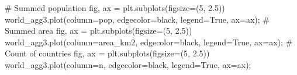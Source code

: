 \documentclass[
  letterpaper,
]{krantz}
\newenvironment{Shaded}{\begin{snugshade}}{\end{snugshade}}
\newcommand{\CommentTok}[1]{\textcolor[rgb]{0.37,0.37,0.37}{#1}}
\newcommand{\DecValTok}[1]{\textcolor[rgb]{0.68,0.00,0.00}{#1}}
\newcommand{\FloatTok}[1]{\textcolor[rgb]{0.68,0.00,0.00}{#1}}
\newcommand{\NormalTok}[1]{\textcolor[rgb]{0.00,0.23,0.31}{#1}}
\newcommand{\OperatorTok}[1]{\textcolor[rgb]{0.37,0.37,0.37}{#1}}
\newcommand{\StringTok}[1]{\textcolor[rgb]{0.13,0.47,0.30}{#1}}
\newcommand{\VariableTok}[1]{\textcolor[rgb]{0.07,0.07,0.07}{#1}}
\begin{document}
\begin{Shaded}
\begin{Highlighting}[]
\CommentTok{\# Summed population}
\NormalTok{fig, ax }\OperatorTok{=}\NormalTok{ plt.subplots(figsize}\OperatorTok{=}\NormalTok{(}\DecValTok{5}\NormalTok{, }\FloatTok{2.5}\NormalTok{))}
\NormalTok{world\_agg3.plot(column}\OperatorTok{=}\StringTok{\textquotesingle{}pop\textquotesingle{}}\NormalTok{, edgecolor}\OperatorTok{=}\StringTok{\textquotesingle{}black\textquotesingle{}}\NormalTok{, legend}\OperatorTok{=}\VariableTok{True}\NormalTok{, ax}\OperatorTok{=}\NormalTok{ax)}\OperatorTok{;}
\CommentTok{\# Summed area}
\NormalTok{fig, ax }\OperatorTok{=}\NormalTok{ plt.subplots(figsize}\OperatorTok{=}\NormalTok{(}\DecValTok{5}\NormalTok{, }\FloatTok{2.5}\NormalTok{))}
\NormalTok{world\_agg3.plot(column}\OperatorTok{=}\StringTok{\textquotesingle{}area\_km2\textquotesingle{}}\NormalTok{, edgecolor}\OperatorTok{=}\StringTok{\textquotesingle{}black\textquotesingle{}}\NormalTok{, legend}\OperatorTok{=}\VariableTok{True}\NormalTok{, ax}\OperatorTok{=}\NormalTok{ax)}\OperatorTok{;}
\CommentTok{\# Count of countries}
\NormalTok{fig, ax }\OperatorTok{=}\NormalTok{ plt.subplots(figsize}\OperatorTok{=}\NormalTok{(}\DecValTok{5}\NormalTok{, }\FloatTok{2.5}\NormalTok{))}
\NormalTok{world\_agg3.plot(column}\OperatorTok{=}\StringTok{\textquotesingle{}n\textquotesingle{}}\NormalTok{, edgecolor}\OperatorTok{=}\StringTok{\textquotesingle{}black\textquotesingle{}}\NormalTok{, legend}\OperatorTok{=}\VariableTok{True}\NormalTok{, ax}\OperatorTok{=}\NormalTok{ax)}\OperatorTok{;}
\end{Highlighting}
\end{Shaded}
\end{document}
